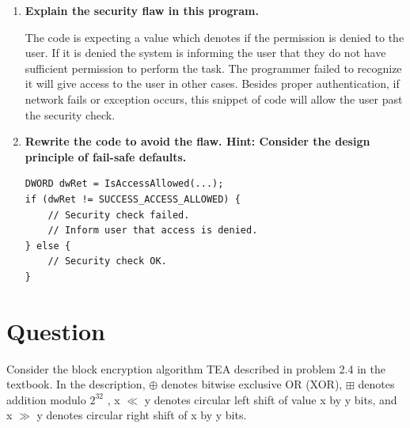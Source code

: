 \documentclass{article}
\begin{document}
\begin{enumerate}[label=\alph*]
\item \textbf{Explain the security flaw in this program.}

The code is expecting a value which denotes if the permission is denied to the user. If it is denied the system is informing the user that they do not have sufficient permission to perform the task. The programmer failed to recognize it will give access to the user in other cases. Besides proper authentication, if network fails or exception occurs, this snippet of code will allow the user past the security check.

\item \textbf{Rewrite the code to avoid the flaw.
Hint: Consider the design principle of fail-safe defaults.}
\begin{verbatim}
DWORD dwRet = IsAccessAllowed(...);
if (dwRet != SUCCESS_ACCESS_ALLOWED) {
    // Security check failed.
    // Inform user that access is denied.
} else {
    // Security check OK.
}
\end{verbatim}

\end{enumerate}


\section {Question}

Consider the block encryption algorithm TEA described in problem 2.4 in the textbook. In the description, $\oplus$ denotes bitwise  exclusive  OR (XOR), $\boxplus$ denotes addition modulo $2^{32}$
, x $\ll$ y denotes circular left shift of value x by y bits, and x $\gg$ y denotes circular right shift
of x by y bits.
\end{document}
